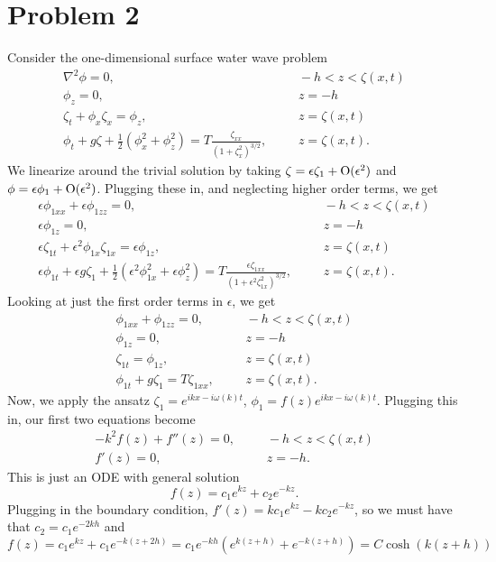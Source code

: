 \documentclass{article}
\begin{document}
\section{Problem 2}
Consider the one-dimensional
surface water wave problem 
\begin{eqnarray*}
	\nabla^2\phi=0,&& ~~~~-h<z<\zeta(x,t)\\
	\phi_z=0, && ~~~~ z=-h\\
	\zeta_t+\phi_x\zeta_x=\phi_z, && ~~~~z=\zeta(x,t)\\
	\phi_t+g\zeta+\frac{1}{2}\left(\phi_x^2+\phi_z^2\right)=
	T\frac{\zeta_{xx}}{\left(1+\zeta_x^2\right)^{3/2}}, && ~~~~z=\zeta(x,t).
\end{eqnarray*}
We linearize around the trivial solution by taking $\zeta=\epsilon\zeta_1+\operatorname{O}(\epsilon^2)$ and $\phi=\epsilon\phi_1+\operatorname{O}(\epsilon^2)$. Plugging these in, and neglecting higher order terms, we get 
\begin{eqnarray*}
	\epsilon\phi_{1xx}+\epsilon\phi_{1zz}=0,&& ~~~~-h<z<\zeta(x,t)\\
	\epsilon\phi_{1z}=0, && ~~~~ z=-h\\
	\epsilon\zeta_{1t}+\epsilon^2\phi_{1x}\zeta_{1x}=\epsilon\phi_{1z}, && ~~~~z=\zeta(x,t)\\
	\epsilon\phi_{1t}+\epsilon g\zeta_1+\frac{1}{2}\left(\epsilon^2\phi_{1x}^2+\epsilon\phi_z^2\right)=
	T\frac{\epsilon\zeta_{1xx}}{\left(1+\epsilon^2\zeta_{1x}^2\right)^{3/2}}, && ~~~~z=\zeta(x,t).
\end{eqnarray*}
Looking at just the first order terms in $\epsilon$, we get
\begin{eqnarray*}
	\phi_{1xx}+\phi_{1zz}=0,&& ~~~~-h<z<\zeta(x,t)\\
	\phi_{1z}=0, && ~~~~ z=-h\\
	\zeta_{1t}=\phi_{1z}, && ~~~~z=\zeta(x,t)\\
	\phi_{1t}+g\zeta_1=
	T\zeta_{1xx}, && ~~~~z=\zeta(x,t).
\end{eqnarray*}
Now, we apply the ansatz $\zeta_1=e^{ikx-i\omega(k)t}$, $\phi_1=f(z)e^{ikx-i\omega(k)t}$. Plugging this in, our first two equations become
\begin{eqnarray*}
	-k^2f(z)+f''(z)=0,&& ~~~~-h<z<\zeta(x,t)\\
f'(z)=0, && ~~~~ z=-h.
\end{eqnarray*}
This is just an ODE with general solution 
\[
f(z)=c_1e^{kz}+c_2e^{-kz}.
\]
Plugging in the boundary condition, $f'(z)=kc_1e^{kz}-kc_2e^{-kz}$, so we must have that $c_2=c_1e^{-2kh}$ and 
\[
f(z)=c_1e^{kz}+c_1e^{-k(z+2h)}=c_1e^{-kh}(e^{k(z+h)}+e^{-k(z+h)})=C\cosh(k(z+h))
\] 
\end{document}
